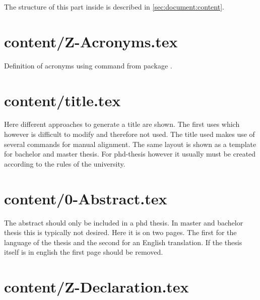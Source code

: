 The structure of this part inside  is described in  \vref{sec:document:content}.

\section{content/Z-Acronyms.tex}

Definition of acronyms using command  from package .


\section{content/title.tex}

Here different approaches to generate a title are shown. The first uses  which however is difficult to modify and therefore not used. The title used makes use of several  commands for manual alignment. The same layout is shown as a template for bachelor and master thesis. For phd-thesis however it usually must be created according to the rules of the university.


\section{content/0-Abstract.tex}

The abstract should only be included in a phd thesis. In master and bachelor thesis this is typically not desired. Here it is on two pages. The first for the language of the thesis and the second for an English translation.
If the thesis itself is in english the first page should be removed.


\section{content/Z-Declaration.tex}

